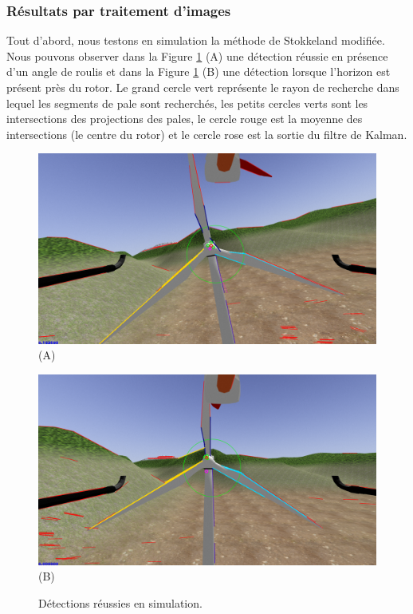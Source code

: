\subsubsection{Résultats par traitement d'images}

Tout d'abord, nous testons en simulation la méthode de Stokkeland modifiée. Nous pouvons observer dans la Figure \ref{fig:sim_detection} (A) une détection réussie en présence d'un angle de roulis et dans la Figure \ref{fig:sim_detection} (B) une détection lorsque l'horizon est présent près du rotor. Le grand cercle vert représente le rayon de recherche dans lequel les segments de pale sont recherchés, les petits cercles verts sont les intersections des projections des pales, le cercle rouge est la moyenne des intersections (le centre du rotor) et le cercle rose est la sortie du filtre de Kalman.
\begin{figure}[htbp]
  \centering
  \begin{minipage}{0.49\textwidth}
    \centering
    \includegraphics[width=\linewidth]{images/sim_detection.png} (A)
  \end{minipage}
  \begin{minipage}{0.49\textwidth}
    \centering
    \includegraphics[width=\linewidth]{images/sim_detection3.png} (B)
  \end{minipage}
  \caption{Détections réussies en simulation.}
  \label{fig:sim_detection}
\end{figure}

